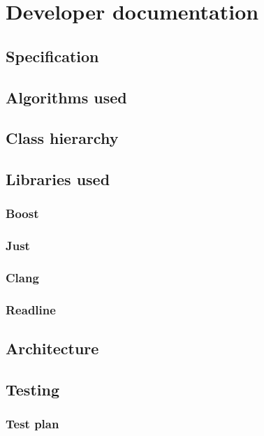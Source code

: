 
\chapter{Developer documentation}

\section{Specification}

\section{Algorithms used}

\section{Class hierarchy}


\section{Libraries used}

\subsection*{Boost}

\subsection*{Just}

\subsection*{Clang}

\subsection*{Readline}

\section{Architecture}

\section{Testing}

\subsection{Test plan}

